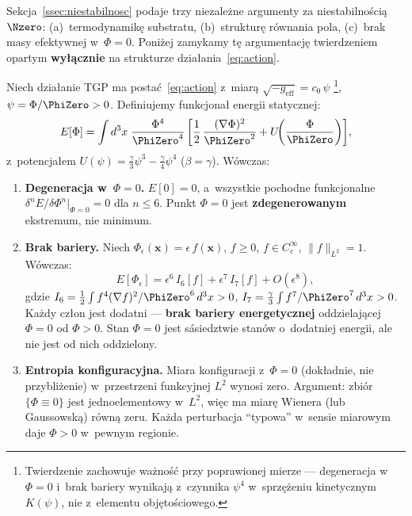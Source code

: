 Sekcja~\ref{ssec:niestabilnosc} podaje trzy niezale\.zne argumenty
za niestabilno\'sci\k{a} $\Nzero$: (a)~termodynamik\k{e} substratu,
(b)~struktur\k{e} r\'ownania pola, (c)~brak masy efektywnej w~$\Phi=0$.
Poni\.zej zamykamy t\k{e} argumentacj\k{e} twierdzeniem opartym
\textbf{wy\l{}\k{a}cznie} na strukturze dzia\l{}ania~\eqref{eq:action}.

\begin{theorem}[Niestabilno\'s\'c $\Phi = 0$
  z~dzia\l{}ania TGP]\label{thm:N0-action-instability}
Niech dzia\l{}anie TGP ma posta\'c~\eqref{eq:action}
z~miar\k{a} $\sqrt{-g_{\mathrm{eff}}} = c_0\,\psi$%
\footnote{Twierdzenie zachowuje wa\.zno\'s\'c przy poprawionej mierze ---
  degeneracja w~$\Phi=0$ i~brak bariery wynikaj\k{a}
  z~czynnika $\psi^4$ w~sprz\k{e}\.zeniu kinetycznym $K(\psi)$,
  nie z~elementu obj\k{e}to\'sciowego.},
$\psi = \Phi/\PhiZero > 0$.
Definiujemy funkcjona\l{} energii statycznej:
\begin{equation}\label{eq:E-static}
  E[\Phi] = \int d^3x\;\frac{\Phi^4}{\PhiZero^4}\,
  \biggl[\frac{1}{2}\,\frac{(\nabla\Phi)^2}{\PhiZero^2}
  + U\!\biggl(\frac{\Phi}{\PhiZero}\biggr)\biggr],
\end{equation}
z~potencja\l{}em $U(\psi) = \frac{\gamma}{3}\psi^3
- \frac{\gamma}{4}\psi^4$ ($\beta = \gamma$).
W\'owczas:
\begin{enumerate}
  \item \textbf{Degeneracja w~$\Phi = 0$.}
    $E[0] = 0$, a~wszystkie pochodne funkcjonalne
    $\delta^n E/\delta\Phi^n\big|_{\Phi=0} = 0$
    dla $n \le 6$. Punkt $\Phi = 0$ jest
    \textbf{zdegenerowanym} ekstremum, nie minimum.
  \item \textbf{Brak bariery.}
    Niech $\Phi_\epsilon(\mathbf{x}) = \epsilon\,f(\mathbf{x})$,
    $f \ge 0$, $f \in C^\infty_c$, $\|f\|_{L^2} = 1$.
    W\'owczas:
    \begin{equation}\label{eq:E-N0-expansion}
      E[\Phi_\epsilon] = \epsilon^6\,I_6[f]
      + \epsilon^7\,I_7[f] + O(\epsilon^8),
    \end{equation}
    gdzie $I_6 = \frac{1}{2}\int f^4(\nabla f)^2/\PhiZero^6\,d^3x > 0$,
    $I_7 = \frac{\gamma}{3}\int f^7/\PhiZero^7\,d^3x > 0$.
    Ka\.zdy cz\l{}on jest dodatni --- \textbf{brak bariery
    energetycznej} oddzielaj\k{a}cej $\Phi = 0$ od $\Phi > 0$.
    Stan $\Phi = 0$ jest s\'asiedztwie stan\'ow o~dodatniej energii,
    ale nie jest od nich oddzielony.
  \item \textbf{Entropia konfiguracyjna.}
    Miara konfiguracji z~$\Phi = 0$ (dok\l{}adnie, nie przybli\.zenie)
    w~przestrzeni funkcyjnej $L^2$ wynosi zero.
    Argument: zbi\'or $\{\Phi \equiv 0\}$ jest
    jednoelementowy w~$L^2$, wi\k{e}c ma miar\k{e} Wienera
    (lub Gaussowsk\k{a}) r\'own\k{a} zeru.
    Ka\.zda perturbacja ``typowa'' w~sensie
    miarowym daje $\Phi > 0$ w~pewnym regionie.
\end{enumerate}
\end{theorem}

